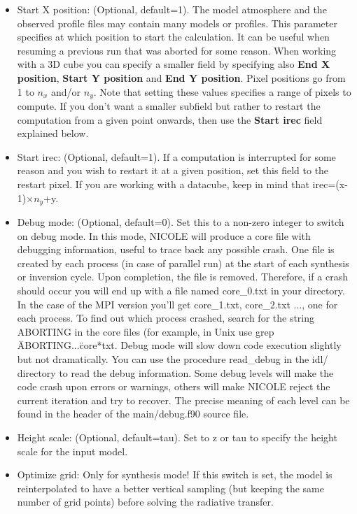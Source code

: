 \begin{itemize}
\item Start X position: (Optional, default=1). The model atmosphere and
  the observed profile files may contain many models or profiles. This
  parameter specifies at which position to start the calculation. It
  can be useful when resuming a previous run that was aborted for some
  reason. When working with a 3D cube you can specify a smaller field by 
  specifying also {\bf End X position}, {\bf Start Y position} and {\bf End Y position}.
  Pixel positions go from 1 to $n_x$ and/or $n_y$.
  Note that setting these values specifies a range of pixels to compute.
  If you don't want a smaller subfield but rather to restart the computation
  from a given point onwards, then use the {\bf Start irec} field explained
  below.
\item Start irec: (Optional, default=1). If a computation is interrupted for some reason and
  you wish to restart it at a given position, set this field to the
  restart pixel. If you are working with a datacube, keep in mind that
  irec=(x-1)$\times n_y$+y.
\item Debug mode: (Optional, default=0). Set this to a non-zero
  integer to switch on debug mode. In this mode, NICOLE will produce a
  core file with debugging information, useful to trace back any
  possible crash. One file is created by each process (in case of
  parallel run) at the start of each synthesis or inversion
  cycle. Upon completion, the file is removed.  Therefore, if a crash
  should occur you will end up with a file named core\_0.txt in your
  directory. In the case of the MPI version you'll get core\_1.txt,
  core\_2.txt ..., one for each process. To find out which process
  crashed, search for the string ABORTING in the core files (for
  example, in Unix use grep \"ABORTING...\" core*txt. Debug mode will
  slow down code execution slightly but not dramatically. You can use
  the procedure read\_debug in the idl/ directory to read the debug
  information. Some debug levels will make the code crash upon errors
  or warnings, others will make NICOLE reject the current iteration
  and try to recover. The precise meaning of each level can be
  found in the header of the main/debug.f90 source file.
\item Height scale: (Optional, default=tau). Set to z or tau to
  specify the height scale for the input model.
\item Optimize grid: Only for synthesis mode! If this switch is set,
  the model is reinterpolated to have a better vertical sampling (but
  keeping the same number of grid points) before solving the radiative
  transfer.
\end{itemize}

